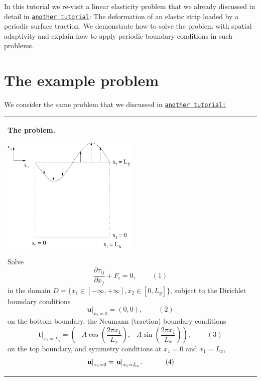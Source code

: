 In this tutorial we re-\/visit a linear elasticity problem that we already discussed in detail in \href{../../periodic_load/html/index.html}{\tt another tutorial}\+: The deformation of an elastic strip loaded by a periodic surface traction. We demonstrate how to solve the problem with spatial adaptivity and explain how to apply periodic boundary conditions in such problems.



 

\hypertarget{index_example}{}\section{The example problem}\label{index_example}
We consider the same problem that we discussed in \href{../../periodic_load/html/index.html}{\tt another tutorial\+:}

\begin{center} \tabulinesep=1mm
\begin{longtabu} spread 0pt [c]{*{1}{|X[-1]}|}
\hline
\begin{center} {\bfseries The problem.} \end{center}   
\begin{DoxyImage}
\includegraphics[width=0.5\textwidth]{attempt3}
\end{DoxyImage}
 Solve \[ \frac{\partial \tau_{ij}}{\partial x_j} + F_i=0, \ \ \ \ \ \ \ \ \ \ (1) \] in the domain $ D = \{x_1 \in [-\infty,+\infty], x_2 \in [0,L_y]\} $, subject to the Dirichlet boundary conditions \[ \left. \mathbf{u}\right|_{x_2 = 0}=(0,0), \ \ \ \ \ \ \ \ \ \ (2) \] on the bottom boundary, the Neumann (traction) boundary conditions \[ \left. \mathbf{t}\right|_{x_2 = L_y}=\left(-A \cos{\left(\frac{2 \pi x_1}{L_x}\right)}, -A \sin{\left(\frac{2 \pi x_1}{L_x}\right)}\right), \ \ \ \ \ \ \ \ \ \ (3) \] on the top boundary, and symmetry conditions at $ x_1 = 0 $ and $ x_1 = L_x$, \[ \left. {\bf u}\right|_{x_1=0} = \left.{\bf u}\right|_{x_1=L_x}. \ \ \ \ \ \ \ \ \ \ (4) \]   \\
\end{longtabu}
\end{center} 

